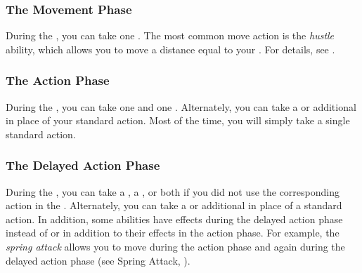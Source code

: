         \subsubsection{The Movement Phase}\label{The Movement Phase}
            During the , you can take one .
            The most common move action is the \textit{hustle} ability, which allows you to move a distance equal to your .
            For details, see .

        \subsubsection{The Action Phase}\label{The Action Phase}
            During the , you can take one  and one .
            Alternately, you can take a  or additional  in place of your standard action.
            Most of the time, you will simply take a single standard action.

        \subsubsection{The Delayed Action Phase}\label{The Delayed Action Phase}
            During the , you can take a , a , or both if you did not use the corresponding action in the .
            Alternately, you can take a  or additional  in place of a standard action.
            In addition, some abilities have effects during the delayed action phase instead of or in addition to their effects in the action phase.
            For example, the \textit{spring attack}  allows you to move during the action phase and again during the delayed action phase (see Spring Attack, ).

